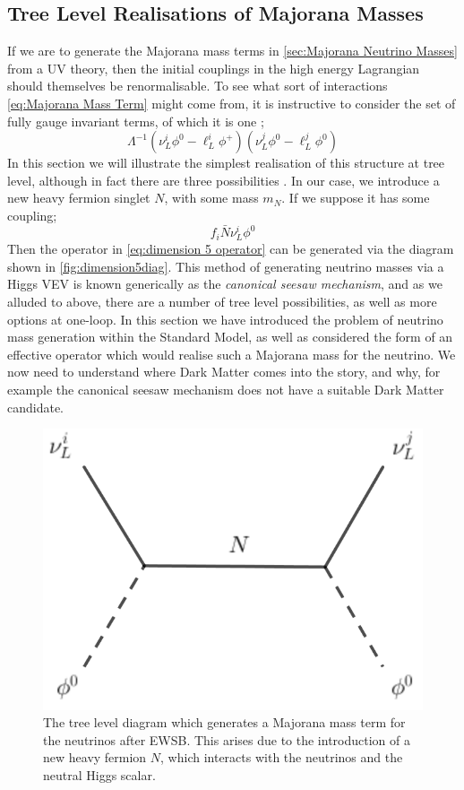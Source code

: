 \documentclass[10pt]{article}
\begin{document}
\subsection{Tree Level Realisations of Majorana Masses}\label{sec:Tree Level Realisations of Majorana Masses}
If we are to generate the Majorana mass terms in \ref{sec:Majorana Neutrino Masses} from a UV theory, then the initial couplings in the high energy Lagrangian should themselves be renormalisable. To see what sort of interactions \eqref{eq:Majorana Mass Term} might come from, it is instructive to consider the set of fully gauge invariant terms, of which it is one \cite{Ma2006a};
\begin{equation}\label{eq:dimension 5 operator}
  \Lambda^{-1}(\nu^i_L \phi^0 - \ell^i_L \phi^+)(\nu^j_L \phi^0 - \ell^j_L \phi^0)
\end{equation}
In this section we will illustrate the simplest realisation of this structure at tree level, although in fact there are three possibilities \cite{Ma1998}. In our case, we introduce a new heavy fermion singlet $N$, with some mass $m_N$. If we suppose it has some coupling;
\begin{equation}
  f_i \bar{N}\nu^i_L \phi^0
\end{equation}
Then the operator in \eqref{eq:dimension 5 operator} can be generated via the diagram shown in \autoref{fig:dimension5diag}. This method of generating neutrino masses via a Higgs VEV is known generically as the \textit{canonical seesaw mechanism}, and as we alluded to above, there are a number of tree level possibilities, as well as more options at one-loop. In this section we have introduced the problem of neutrino mass generation within the Standard Model, as well as considered the form of an effective operator which would realise such a Majorana mass for the neutrino. We now need to understand where Dark Matter comes into the story, and why, for example the canonical seesaw mechanism does not have a suitable Dark Matter candidate.
\begin{figure}
  \begin{framed}
  \centering
  \includegraphics[width=0.4\linewidth]{dimension5operator}
  \caption{The tree level diagram which generates a Majorana mass term for the neutrinos after EWSB. This arises due to the introduction of a new heavy fermion $N$, which interacts with the neutrinos and the neutral Higgs scalar.}
  \label{fig:dimension5diag}
  \end{framed}
\end{figure}
\end{document}
